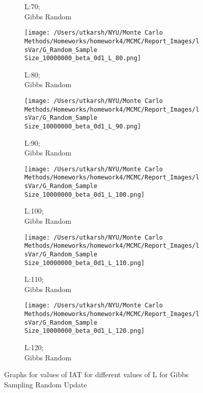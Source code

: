 \documentclass[11pt]{article}
\begin{document}
\begin{figure}[H]
\begin{subfigure}{.20\textwidth}
		\caption{L:70;\\Gibbs Random}
	\end{subfigure}
	\begin{subfigure}{.20\textwidth}
		\texttt{[image: /Users/utkarsh/NYU/Monte Carlo Methods/Homeworks/homework4/MCMC/Report\_Images/lsVar/G\_Random\_Sample Size\_10000000\_beta\_0d1\_L\_80.png]}
		\caption{L:80;\\Gibbs Random}
	\end{subfigure}
	\begin{subfigure}{.20\textwidth}
		\texttt{[image: /Users/utkarsh/NYU/Monte Carlo Methods/Homeworks/homework4/MCMC/Report\_Images/lsVar/G\_Random\_Sample Size\_10000000\_beta\_0d1\_L\_90.png]}
		\caption{L:90;\\Gibbs Random}
	\end{subfigure}
	\begin{subfigure}{.20\textwidth}
		\texttt{[image: /Users/utkarsh/NYU/Monte Carlo Methods/Homeworks/homework4/MCMC/Report\_Images/lsVar/G\_Random\_Sample Size\_10000000\_beta\_0d1\_L\_100.png]}
		\caption{L:100;\\Gibbs Random}
	\end{subfigure}
	\begin{subfigure}{.20\textwidth}
		\texttt{[image: /Users/utkarsh/NYU/Monte Carlo Methods/Homeworks/homework4/MCMC/Report\_Images/lsVar/G\_Random\_Sample Size\_10000000\_beta\_0d1\_L\_110.png]}
		\caption{L:110;\\Gibbs Random}
	\end{subfigure}
	\begin{subfigure}{.20\textwidth}
		\texttt{[image: /Users/utkarsh/NYU/Monte Carlo Methods/Homeworks/homework4/MCMC/Report\_Images/lsVar/G\_Random\_Sample Size\_10000000\_beta\_0d1\_L\_120.png]}
		\caption{L:120;\\Gibbs Random}
	\end{subfigure}
    \caption{Graphs for values of IAT for different values of L for Gibbs Sampling Random Update}
\label{fig:iat_ls_gibbs_radnom}
\end{figure}
\end{document}
